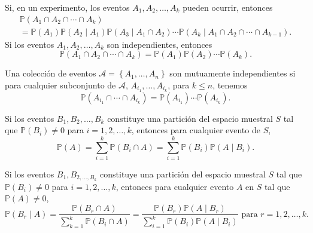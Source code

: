 \begin{theorem}[]
Si, en un experimento, los eventos $A_{1}, A_{2}, \ldots, A_{k}$ pueden ocurrir, entonces
\begin{multline}
\mathds{P}\left(A_{1}\cap A_{2}\cap\cdots\cap A_{k}\right)\\
=\mathds{P}\left(A_{1}\right)\mathds{P}\left(A_{2}\mid A_{1}\right)\mathds{P}\left(A_{3}\mid A_{1}\cap A_{2}\right)\cdots\mathds{P}\left(A_{k}\mid A_{1}\cap A_{2}\cap \cdots\cap A_{k-1}\right).
\end{multline}
Si los eventos $A_{1}, A_{2},\ldots,A_{k}$ son independientes, entonces
\begin{equation*}
\mathds{P}\left(A_{1}\cap A_{2}\cap\cdots\cap A_{k}\right)=\mathds{P}\left(A_{1}\right)\mathds{P}\left(A_{2}\right)\cdots\mathds{P}\left(A_{k}\right).
\end{equation*}
\end{theorem}

\begin{definition}[]
Una colección de eventos $\mathcal{A}=\left\{A_{1},\ldots,A_{n}\right\}$ son mutuamente independientes si para cualquier subconjunto de $\mathcal{A}$, $A_{i_{1}},\ldots, A_{i_{k}}$, para $k\le n$, tenemos
\begin{equation*}
\mathds{P}\left(A_{i_{1}}\cap\cdots\cap A_{i_{k}}\right)=\mathds{P}\left(A_{i_{1}}\right)\cdots\mathds{P}\left(A_{i_{k}}\right).
\end{equation*}
\end{definition}

\begin{theorem}[]
Si los eventos $B_{1}, B_{2},\ldots, B_{k}$ constituye una partición del espacio muestral $S$ tal que $\mathds{P}\left(B_{i}\right)\neq0$ para $i=1,2,\ldots, k$, entonces para cualquier evento de $S$,
\begin{equation*}
\mathds{P}\left(A\right)=\sum_{i=1}^{k}\mathds{P}\left(B_{i}\cap A\right)=\sum_{i=1}^{k}\mathds{P}\left(B_{i}\right)\mathds{P}\left(A\mid B_{i}\right).
\end{equation*}
\end{theorem}

\begin{theorem}
Si los eventos $B_{1}, B_{2,\ldots, B_{k}}$ constituye una partición del espacio muestral $S$ tal que $\mathds{P}\left(B_{i}\right)\neq0$ para $i=1,2,\ldots, k$, entonces para cualquier evento $A$ en $S$ tal que $\mathds{P}\left(A\right)\neq 0$,
\begin{equation*}
\mathds{P}\left(B_{r}\mid A\right)=\frac{\mathds{P}\left(B_{r}\cap A\right)}{\displaystyle\sum_{k=1}^{k}\mathds{P}\left(B_{i}\cap A\right)}=\frac{\mathds{P}\left(B_{r}\right)\mathds{P}\left(A\mid B_{r}\right)}{\displaystyle\sum_{i=1}^{k}\mathds{P}\left(B_{i}\right)\mathds{P}\left(A\mid B_{i}\right)}\text{ para }r=1,2,\ldots,k.
\end{equation*}
\end{theorem}

